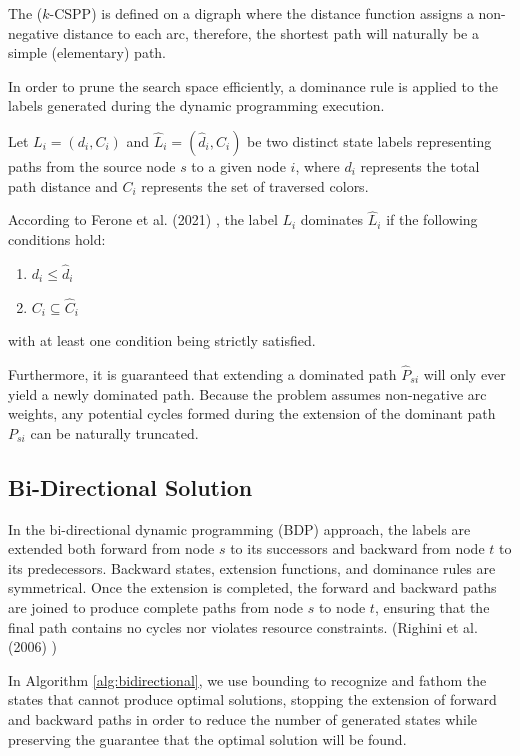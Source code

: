 \documentclass[pdflatex,sn-mathphys-num]{sn-jnl}
\begin{document}
The ($k$-CSPP) is defined on a digraph where the distance function assigns a non-negative distance to each arc, therefore, the shortest path will naturally be a simple (elementary) path.

In order to prune the search space efficiently, a dominance rule is applied to the labels generated during the dynamic programming execution. 

Let $L_i = (d_i, C_i)$ and $\hat{L}_i = (\hat{d}_i, \hat{C}_i)$ be two distinct state labels representing paths from 
the source node $s$ to a given node $i$, where $d_i$ represents the total path distance and $C_i$ represents the set of traversed colors.  

According to Ferone et al. (2021) \cite{Ferone2021}, the label $L_i$ dominates $\hat{L}_i$ if the following conditions hold:
\begin{enumerate}
    \item $d_i \le \hat{d}_i$ 
    \item  $C_i \subseteq \hat{C}_i$   
\end{enumerate}
with at least one condition being strictly satisfied.

Furthermore, it is guaranteed \cite{Ferone2021} that extending a dominated path $\hat{P}_{si}$ will only ever yield a newly dominated path. 
Because the problem assumes non-negative arc weights, any potential cycles formed during the extension of the dominant path $P_{si}$ can be naturally truncated. 

\subsection{Bi-Directional Solution}
In the bi-directional dynamic programming (BDP) approach, the labels are extended both forward from node $s$ to
its successors and backward from node $t$ to its predecessors. 
Backward states, extension functions, and dominance rules are symmetrical.
Once the extension is completed, the forward and backward paths are joined to produce complete paths from node $s$ to node $t$,
ensuring that the final path contains no cycles nor violates resource constraints. (Righini et al. (2006) \cite{righini2006})

In Algorithm \ref{alg:bidirectional}, we use bounding to recognize and fathom the states that cannot
produce optimal solutions, stopping the extension of forward and backward paths in order to reduce the number
of generated states while preserving the guarantee that the optimal solution will be found. 
\end{document}
